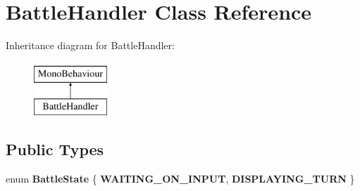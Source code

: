\hypertarget{class_battle_handler}{\section{Battle\-Handler Class Reference}
\label{class_battle_handler}
}


 


Inheritance diagram for Battle\-Handler\-:\begin{figure}[H]
\begin{center}
\leavevmode
\includegraphics[height=2.000000cm]{class_battle_handler}
\end{center}
\end{figure}
\subsection*{Public Types}
\begin{DoxyCompactItemize}
\item 
enum {\bfseries Battle\-State} \{ {\bfseries W\-A\-I\-T\-I\-N\-G\-\_\-\-O\-N\-\_\-\-I\-N\-P\-U\-T}, 
{\bfseries D\-I\-S\-P\-L\-A\-Y\-I\-N\-G\-\_\-\-T\-U\-R\-N}
 \}
\end{DoxyCompactItemize}
